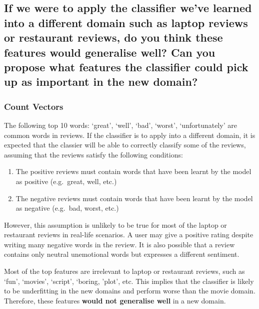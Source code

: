 \documentclass[11pt]{article}
\providecommand{\tightlist}{%
      \setlength{\itemsep}{0pt}\setlength{\parskip}{0pt}}
\begin{document}
    \hypertarget{if-we-were-to-apply-the-classifier-weve-learned-into-a-different-domain-such-as-laptop-reviews-or-restaurant-reviews-do-you-think-these-features-would-generalise-well-can-you-propose-what-features-the-classifier-could-pick-up-as-important-in-the-new-domain}{%
\subsection{If we were to apply the classifier we've learned into a
different domain such as laptop reviews or restaurant reviews, do you
think these features would generalise well? Can you propose what
features the classifier could pick up as important in the new
domain?}\label{if-we-were-to-apply-the-classifier-weve-learned-into-a-different-domain-such-as-laptop-reviews-or-restaurant-reviews-do-you-think-these-features-would-generalise-well-can-you-propose-what-features-the-classifier-could-pick-up-as-important-in-the-new-domain}}

\hypertarget{count-vectors}{%
\subsubsection{Count Vectors}\label{count-vectors}}

The following top 10 words: `great', `well', `bad', `worst',
`unfortunately' are common words in reviews. If the classifier is to
apply into a different domain, it is expected that the classier will be
able to correctly classify some of the reviews, assuming that the
reviews satisfy the following conditions:

\begin{enumerate}
\def\labelenumi{\arabic{enumi}.}
\tightlist
\item
  The positive reviews must contain words that have been learnt by the
  model as positive (e.g.~great, well, etc.)
\item
  The negative reviews must contain words that have been learnt by the
  model as negative (e.g.~bad, worst, etc.)
\end{enumerate}

However, this assumption is unlikely to be true for most of the laptop
or restaurant reviews in real-life scenarios. A user may give a positive
rating despite writing many negative words in the review. It is also
possible that a review contains only neutral unemotional words but
expresses a different sentiment.

Most of the top features are irrelevant to laptop or restaurant reviews,
such as `fun', `movies', `script', `boring, 'plot', etc. This implies
that the classifier is likely to be underfitting in the new domains and
perform worse than the movie domain. Therefore, these features
\textbf{would not generalise well} in a new domain.
\end{document}
